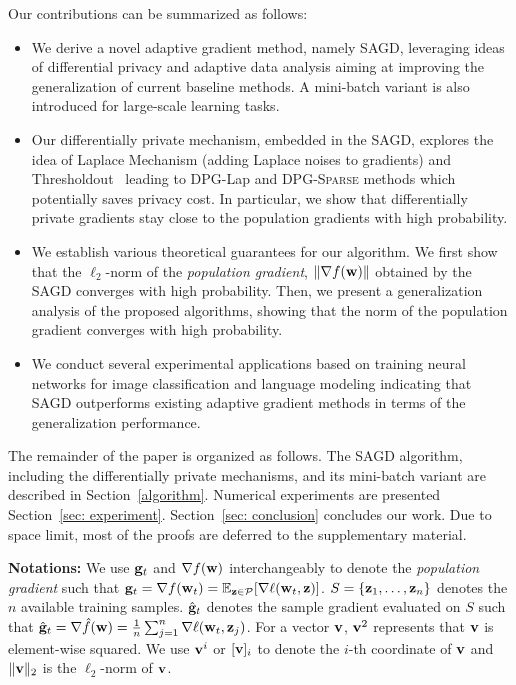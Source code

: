 \documentclass[11pt]{article}
\begin{document}
Our  contributions  can be summarized as follows:
\begin{itemize}
\item We derive a novel adaptive gradient method, namely \textsc{SAGD}, leveraging ideas of differential privacy and adaptive data analysis aiming at improving the generalization of current baseline methods. A mini-batch variant is also introduced for large-scale learning tasks.
\item Our differentially private mechanism, embedded in the \textsc{SAGD}, explores the idea of Laplace Mechanism (adding Laplace noises to gradients) and Thresholdout~\citep{dwro2014} leading to DPG-Lap and \textsc{DPG-Sparse} methods which potentially saves privacy cost. In particular, we show that differentially private gradients stay close to the population gradients with high probability. 
\item We establish various theoretical guarantees for our algorithm. We first show that the $\ell_2$-norm of the \emph{population gradient}, \ie $\|\nabla f(\mathbf{w})\|$ obtained by the \textsc{SAGD} converges with high probability. Then, we present a generalization analysis of the proposed algorithms, showing that the norm of the population gradient converges with high probability.
\item We conduct several experimental applications based on training neural networks for image classification and language modeling indicating that \textsc{SAGD} outperforms existing adaptive gradient methods in terms of the generalization performance.
\end{itemize}
The remainder of the paper is organized as follows.
The \textsc{SAGD} algorithm, including the differentially private mechanisms, and its mini-batch variant are described in Section~\ref{algorithm}. 
Numerical experiments are presented Section~\ref{sec: experiment}. 
Section~\ref{sec: conclusion} concludes our work. 
Due to space limit, most of the proofs are deferred to the supplementary material.

\textbf{Notations:} 
We use $\mathbf{g}_t$ and $\nabla f(\mathbf{w})$ interchangeably to denote the \emph{population gradient} such that $\g_t = \nabla f(\w_t) = \mathbb{E}_{\z \in \cP} [\nabla \ell(\w_t, \z)]$. $S = \left\{\mathbf{z}_{1}, \dots, \mathbf{z}_{n}\right\}$
denotes the $n$ available training samples. $\hat {\mathbf{g}}_t$ denotes the sample gradient evaluated on $S$ such that $\hat {\mathbf{g}}_t = \nabla \hat f(\mathbf{w}) = \frac{1}{n}\sum_{j=1}^n \nabla \ell(\mathbf{w}_t, \mathbf{z}_j)$. For a vector $\mathbf{v}$, $\mathbf{v}^2$ represents that $\mathbf{v}$ is element-wise squared.  We use $\mathbf{v}^i$ or $[\mathbf{v}]_i$ to denote the $i$-th coordinate of $\mathbf{v}$ and $\|\mathbf{v}\|_2$ is the $\ell_2$-norm of $\mathbf{v}$.
\end{document}
